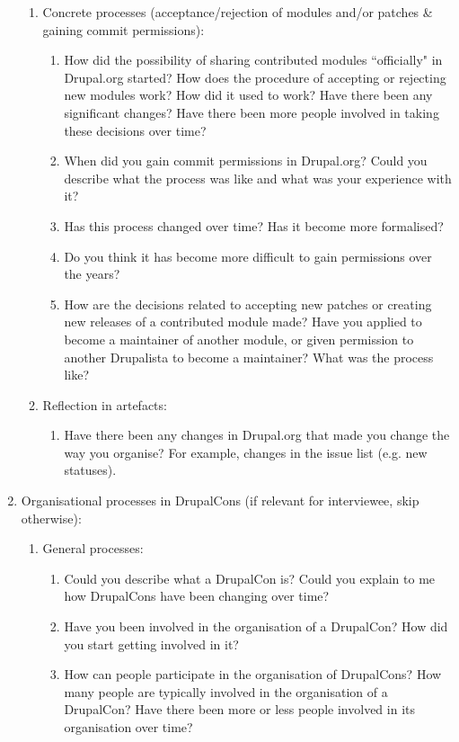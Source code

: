 \begin{enumerate}
\begin{enumerate}
			\item Concrete processes (acceptance/rejection of modules and/or patches \& gaining commit permissions):
			\begin{enumerate}			
				\item How did the possibility of sharing contributed modules ``officially" in Drupal.org started? How does the procedure of accepting or rejecting new modules work? How did it used to work? Have there been any significant changes? Have there been more people involved in taking these decisions over time?
				\item When did you gain commit permissions in Drupal.org? Could you describe what the process was like and what was your experience with it?
				\item Has this process changed over time? Has it become more formalised?
				\item Do you think it has become more difficult to gain permissions over the years?
				\item How are the decisions related to accepting new patches or creating new releases of a contributed module made? Have you applied to become a maintainer of another module, or given permission to another Drupalista to become a maintainer? What was the process like?
			\end{enumerate}

			\item Reflection in artefacts:
			\begin{enumerate}		
				\item Have there been any changes in Drupal.org that made you change the way you organise? For example, changes in the issue list (e.g. new statuses).
			\end{enumerate}

		\end{enumerate}
	
	\item Organisational processes in DrupalCons (if relevant for interviewee, skip otherwise):
		\begin{enumerate}
			\item General processes:
			\begin{enumerate}
				\item Could you describe what a DrupalCon is? Could you explain to me how DrupalCons have been changing over time?	
				\item Have you been involved in the organisation of a DrupalCon? How did you start getting involved in it?
				\item How can people participate in the organisation of DrupalCons? How many people are typically involved in the organisation of a DrupalCon? Have there been more or less people involved in its organisation over time?
			\end{enumerate}
			

\end{enumerate}
\end{enumerate}
